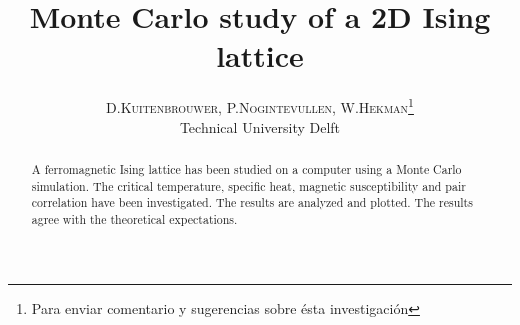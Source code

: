 \documentclass[twoside]{article}
\title{\vspace{-15mm}\fontsize{24pt}{10pt}\selectfont\textbf{Monte Carlo study of a 2D Ising lattice}} %
\author{
\large
\textsc{D.Kuitenbrouwer, P.Nogintevullen, W.Hekman}\thanks{Para enviar comentario y sugerencias sobre ésta investigación}\\[2mm] %
\normalsize Technical University Delft \\ %
\vspace{-5mm}
}
\date{}
\begin{document}
\maketitle %

\thispagestyle{fancy} %


\begin{abstract}

\noindent A ferromagnetic Ising lattice has been studied on a computer using a Monte Carlo simulation. The critical temperature, specific heat, magnetic susceptibility and pair correlation have been investigated. The results are analyzed and plotted. The results agree with the theoretical expectations.

\end{abstract}

\end{document}
